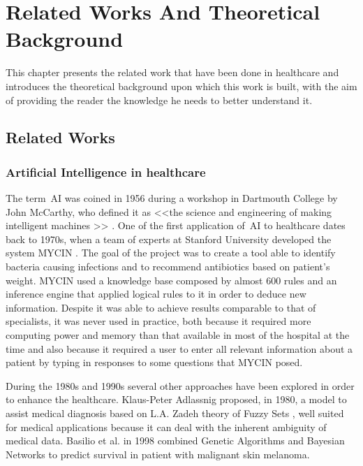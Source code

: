 \chapter{Related Works And Theoretical Background}
\label{cha:second_chapter}
This chapter presents the related work that have been done in healthcare and introduces the theoretical background upon which this work is built, with the aim of providing the reader the knowledge he needs to better understand it. 

\section{Related Works}
\label{sec:second_section}

\subsection{Artificial Intelligence in healthcare}
\label{subsec:ai_in_healtcare}
The term~\ac{AI} was coined in 1956 during a workshop in Dartmouth College by John McCarthy, who defined it as <<the science and engineering of making intelligent machines \omissis>> \cite{mccarthy1998artificial}.
One of the first application of~\ac{AI} to healthcare dates back to 1970s, when a team of experts at Stanford University developed the system MYCIN \cite{shortliffe2012computer}. The goal of the project was to create a tool able to identify bacteria causing infections and to recommend antibiotics based on patient's weight. MYCIN used a knowledge base composed by almost 600 rules and an inference engine that applied logical rules to it in order to deduce new information. Despite it was able to achieve results comparable to that of specialists, it was never used in practice, both because it required more computing power and memory than that available in most of the hospital at the time and also because it required a user to enter all relevant information about a patient by typing in responses to some questions that MYCIN posed.

\vspace{5mm} %
During the 1980s and 1990s several other approaches have been explored in order to enhance the healthcare. Klaus-Peter Adlassnig \cite{fuzzytheory} proposed, in 1980, a model to assist medical diagnosis based on L.A. Zadeh theory of Fuzzy Sets \cite{ZADEH}, well suited for medical applications because it can deal with the inherent ambiguity of medical data. Basilio et al. \cite{Sierra98predictingthe} in 1998 combined Genetic Algorithms \cite{holland:adaptation} and Bayesian Networks \cite{pearl1985bayesian} to predict survival in patient with malignant skin melanoma.

